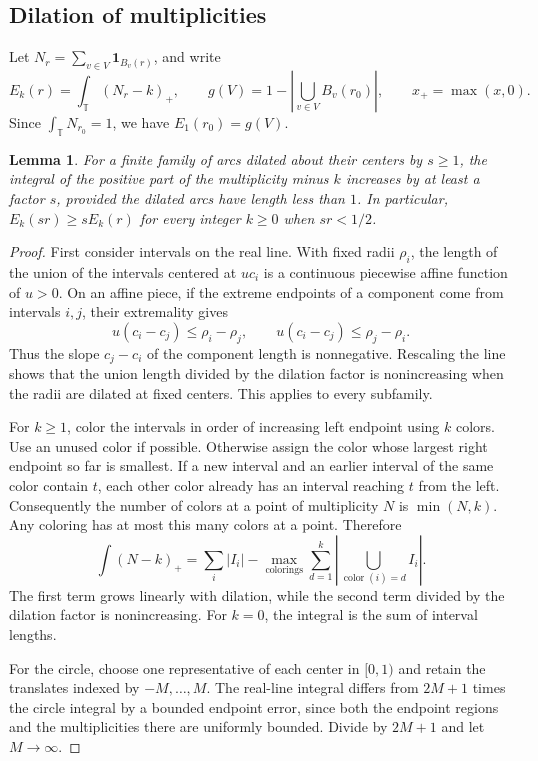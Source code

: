 \documentclass[11pt,a4paper]{article}
\newtheorem{lemma}[theorem]{Lemma}
\begin{document}
\subsection{Dilation of multiplicities}

Let \(N_r=\sum_{v\in V}\mathbf1_{B_v(r)}\), and write
\[
 E_k(r)=\int_{\mathbb T}(N_r-k)_+,\qquad
 g(V)=1-\left|\bigcup_{v\in V} B_v(r_0)\right|,
 \qquad x_+=\max(x,0).
\]
Since \(\int_{\mathbb T}N_{r_0}=1\), we have \(E_1(r_0)=g(V)\).

\begin{lemma}\label{lem:dilation}
For a finite family of arcs dilated about their centers by \(s\ge1\),
the integral of the positive part of the multiplicity minus \(k\)
increases by at least a factor \(s\), provided the dilated arcs have
length less than \(1\). In particular, \(E_k(sr)\ge sE_k(r)\) for every
integer \(k\ge0\) when \(sr<1/2\).
\end{lemma}

\begin{proof}
First consider intervals on the real line. With fixed radii \(\rho_i\),
the length of the union of the intervals centered at \(uc_i\) is a
continuous piecewise affine function of \(u>0\). On an affine piece,
if the extreme endpoints of a component come from intervals \(i,j\),
their extremality gives
\[
 u(c_i-c_j)\le \rho_i-\rho_j,\qquad
 u(c_i-c_j)\le \rho_j-\rho_i.
\]
Thus the slope \(c_j-c_i\) of the component length is nonnegative.
Rescaling the line shows that the union length divided by the dilation
factor is nonincreasing when the radii are dilated at fixed centers.
This applies to every subfamily.

For \(k\ge1\), color the intervals in order of increasing left endpoint
using \(k\) colors. Use an unused color if possible. Otherwise assign
the color whose largest right endpoint so far is smallest. If a new
interval and an earlier interval of the same color contain \(t\),
each other color already has an interval reaching \(t\) from the left.
Consequently the number of colors at a point of multiplicity \(N\)
is \(\min(N,k)\). Any coloring has at most this many colors at a
point. Therefore
\[
 \int(N-k)_+=\sum_i |I_i|-
 \max_{\text{colorings}}\sum_{d=1}^k
       \left|\bigcup_{\operatorname{color}(i)=d}I_i\right|.
\]
The first term grows linearly with dilation, while the second term
divided by the dilation factor is nonincreasing. For \(k=0\), the
integral is the sum of interval lengths.

For the circle, choose one representative of each center in \([0,1)\)
and retain the translates indexed by \(-M,\ldots,M\).
The real-line integral differs from \(2M+1\) times the circle integral
by a bounded endpoint error, since both the endpoint regions and the
multiplicities there are uniformly bounded. Divide by \(2M+1\) and let
\(M\to\infty\).
\end{proof}
\end{document}
